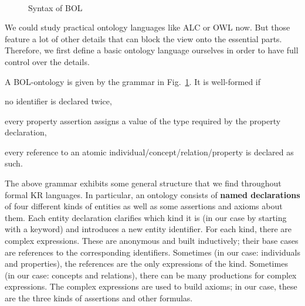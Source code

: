 \begin{figure}
\begin{commgrammar}
\\
\\
\\
\\
\\
\\
\\
\\
\\
\\
\\
\end{commgrammar}
\caption{Syntax of BOL}\label{fig:bol}
\end{figure}

We could study practical ontology languages like ALC or OWL now.
But those feature a lot of other details that can block the view onto the essential parts.
Therefore, we first define a basic ontology language ourselves in order to have full control over the details.

\begin{definition}\label{def:bolsyn}
A BOL-ontology is given by the grammar in Fig.~\ref{fig:bol}.
It is well-formed if
\begin{compactitem}
 \item no identifier is declared twice,
 \item every property assertion assigns a value of the type required by the property declaration,
 \item every reference to an atomic individual/concept/relation/property is declared as such.
\end{compactitem}
\end{definition}

The above grammar exhibits some general structure that we find throughout formal KR languages.
In particular, an ontology consists of \textbf{named declarations} of four different kinds of entities as well as some assertions and axioms about them.
Each entity declaration clarifies which kind it is (in our case by starting with a keyword) and introduces a new entity identifier.
For each kind, there are complex expressions.
These are anonymous and built inductively; their base cases are references to the corresponding identifiers.
Sometimes (in our case: individuals and properties), the references are the only expressions of the kind.
Sometimes (in our case: concepts and relations), there can be many productions for complex expressions.
The complex expressions are used to build axioms; in our case, these are the three kinds of assertions and other formulas.

